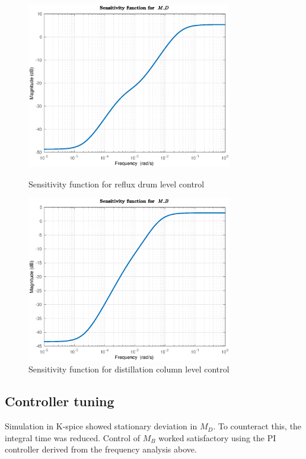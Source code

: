 \documentclass[12pt]{article}
\begin{document}
\begin{figure}[p]
\centering
\includegraphics[width=0.8\textwidth]{../Systemanalyse/Log_Data_to_Matlab/Figurer/DB_tuning/S1.eps}
\caption{Sensitivity function for reflux drum level control}
\label{fig:S1}

\includegraphics[width=0.8\textwidth]{../Systemanalyse/Log_Data_to_Matlab/Figurer/DB_tuning/S2.eps}
\caption{Sensitivity function for distillation column level control}
\label{fig:S2}
\end{figure}

\subsection{Controller tuning}
Simulation in K-spice showed stationary deviation in $M_D$. To counteract this, the integral time was reduced. Control of $M_B$ worked satisfactory using the PI controller derived from the frequency analysis above.
\end{document}
